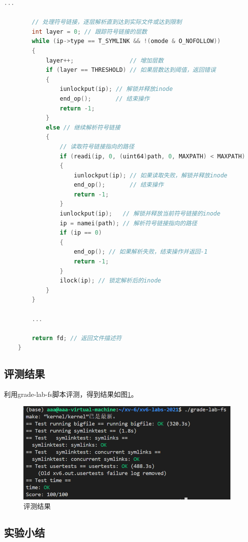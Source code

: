 \begin{enumerate}
\begin{lstlisting}[language=c,title=对sys\_open函数的修改]
        ...
    
        // 处理符号链接，逐层解析直到达到实际文件或达到限制
        int layer = 0; // 跟踪符号链接的层数
        while (ip->type == T_SYMLINK && !(omode & O_NOFOLLOW))
        {
            layer++;                // 增加层数
            if (layer == THRESHOLD) // 如果层数达到阈值，返回错误
            {
                iunlockput(ip); // 解锁并释放inode
                end_op();       // 结束操作
                return -1;
            }
            else // 继续解析符号链接
            {
                // 读取符号链接指向的路径
                if (readi(ip, 0, (uint64)path, 0, MAXPATH) < MAXPATH)
                {
                    iunlockput(ip); // 如果读取失败，解锁并释放inode
                    end_op();       // 结束操作
                    return -1;
                }
                iunlockput(ip);   // 解锁并释放当前符号链接的inode
                ip = namei(path); // 解析符号链接指向的路径
                if (ip == 0)
                {
                    end_op(); // 如果解析失败，结束操作并返回-1
                    return -1;
                }
                ilock(ip); // 锁定解析后的inode
            }
        }
    
        ...
    
        return fd; // 返回文件描述符
    }    
    \end{lstlisting}
\end{enumerate}

\subsection{评测结果}
利用grade-lab-fs脚本评测，得到结果如图\ref{fig:fs}。
\begin{figure}[ht]
    \centering
    \includegraphics[width=\linewidth]{pics/fs评测结果.png}
    \caption{评测结果}
    \label{fig:fs}
\end{figure}
\subsection{实验小结}


